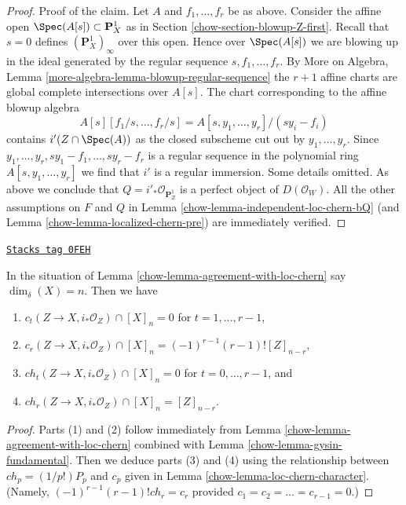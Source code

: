 \begin{proof}
\medskip\noindent
Proof of the claim. Let $A$ and $f_1, \ldots, f_r$ be as above.
Consider the affine open $\Spec(A[s]) \subset \mathbf{P}^1_X$
as in Section \ref{chow-section-blowup-Z-first}. Recall that $s = 0$
defines $(\mathbf{P}^1_X)_\infty$ over this open. Hence over
$\Spec(A[s])$ we are blowing up in the ideal generated by
the regular sequence $s, f_1, \ldots, f_r$. By More on Algebra, Lemma
\ref{more-algebra-lemma-blowup-regular-sequence} the $r + 1$
affine charts are global complete intersections over $A[s]$.
The chart corresponding to the affine blowup algebra
$$
A[s][f_1/s, \ldots, f_r/s] = A[s, y_1, \ldots, y_r]/(sy_i - f_i)
$$
contains $i'(Z \cap \Spec(A))$ as the closed subscheme cut out by
$y_1, \ldots, y_r$. Since $y_1, \ldots, y_r, sy_1 - f_1, \ldots, sy_r - f_r$
is a regular sequence in the polynomial ring $A[s, y_1, \ldots, y_r]$
we find that $i'$ is a regular immersion. Some details omitted.
As above we conclude that $Q = i'_*\mathcal{O}_{\mathbf{P}^1_Z}$
is a perfect object of $D(\mathcal{O}_W)$. All the
other assumptions on $F$ and $Q$ in Lemma \ref{chow-lemma-independent-loc-chern-bQ}
(and Lemma \ref{chow-lemma-localized-chern-pre}) are immediately verified.
\end{proof}

\begin{lemma}
\label{chow-lemma-actual-computation}
\href{https://stacks.math.columbia.edu/tag/0FEH}{\texttt{Stacks tag 0FEH}}

In the situation of Lemma \ref{chow-lemma-agreement-with-loc-chern}
say $\dim_\delta(X) = n$. Then we have
\begin{enumerate}
\item $c_t(Z \to X, i_*\mathcal{O}_Z) \cap [X]_n = 0$ for
$t = 1, \ldots, r - 1$,
\item $c_r(Z \to X, i_*\mathcal{O}_Z) \cap [X]_n =
(-1)^{r - 1}(r - 1)![Z]_{n - r}$,
\item $ch_t(Z \to X, i_*\mathcal{O}_Z) \cap [X]_n = 0$ for
$t = 0, \ldots, r - 1$, and
\item $ch_r(Z \to X, i_*\mathcal{O}_Z) \cap [X]_n = [Z]_{n - r}$.
\end{enumerate}
\end{lemma}

\begin{proof}

Parts (1) and (2) follow immediately from
Lemma \ref{chow-lemma-agreement-with-loc-chern}
combined with Lemma \ref{chow-lemma-gysin-fundamental}.
Then we deduce parts (3) and (4) using the relationship
between $ch_p = (1/p!)P_p$ and $c_p$ given in
Lemma \ref{chow-lemma-loc-chern-character}. (Namely,
$(-1)^{r - 1}(r - 1)!ch_r = c_r$ provided
$c_1 = c_2 = \ldots = c_{r - 1} = 0$.)
\end{proof}

